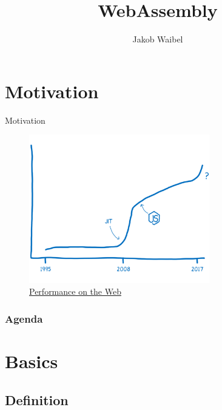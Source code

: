 \documentclass{beamer}
\title[WebAssembly]{WebAssembly}
\author{Jakob Waibel}
\institute[Jakob Waibel]{MI7 Druck und Medien}
\date
\begin{document}
\begin{frame}
    \titlepage
\end{frame}


\section{Motivation}

\begin{frame}{Motivation}
    \begin{figure}
        \includegraphics[width=0.7\textwidth,height=0.7\textheight]{./images/perf_history.png}
        \caption{\href{https://hacks.mozilla.org/2017/02/a-cartoon-intro-to-webassembly/}{Performance on the Web}}
    \end{figure}
\end{frame}


\begin{frame}
    \frametitle{Agenda}
    \begin{multicols}{2}
    \tableofcontents
    \end{multicols}
\end{frame}

\section{Basics} 

\subsection{Definition}
\end{document}
